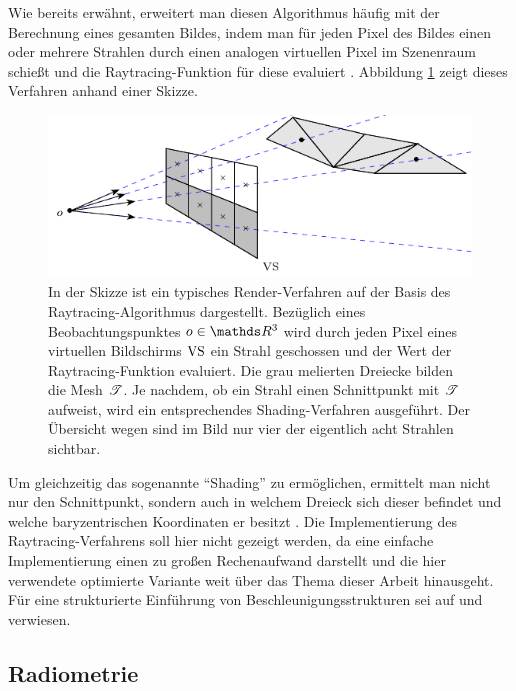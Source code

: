 		Wie bereits erwähnt, erweitert man diesen Algorithmus häufig mit der Berechnung eines gesamten Bildes, indem man für jeden Pixel des Bildes einen oder mehrere Strahlen durch einen analogen virtuellen Pixel im Szenenraum schießt und die Raytracing-Funktion für diese evaluiert \cite{pbrt3,parker-ray-tracing,nikodym-ray-tracing}.
		Abbildung \ref{fig:ray_tracing-2} zeigt dieses Verfahren anhand einer Skizze.
		\begin{figure}[h]
			\center
			\includegraphics{gg_fig/ray_tracing_2.pdf}
			\caption[Raytracing als Render-Verfahren]{In der Skizze ist ein typisches Render-Verfahren auf der Basis des Raytracing-Algorithmus dargestellt. Bezüglich eines Beobachtungspunktes $o\in\SR^3$ wird durch jeden Pixel eines virtuellen Bildschirms $\mathrm{VS}$ ein Strahl geschossen und der Wert der Raytracing-Funktion evaluiert. Die grau melierten Dreiecke bilden die Mesh $\mathscr{T}$. Je nachdem, ob ein Strahl einen Schnittpunkt mit $\mathscr{T}$ aufweist, wird ein entsprechendes Shading-Verfahren ausgeführt. Der Übersicht wegen sind im Bild nur vier der eigentlich acht Strahlen sichtbar.}
			\label{fig:ray_tracing-2}
		\end{figure}
		Um gleichzeitig das sogenannte \enquote{Shading} zu ermöglichen, ermittelt man nicht nur den Schnittpunkt, sondern auch in welchem Dreieck sich dieser befindet und welche baryzentrischen Koordinaten er besitzt \cite{pbrt3,ray-triangle-intersection}.
		Die Implementierung des Raytracing-Verfahrens soll hier nicht gezeigt werden, da eine einfache Implementierung einen zu großen Rechenaufwand darstellt und die hier verwendete optimierte Variante weit über das Thema dieser Arbeit hinausgeht.
		Für eine strukturierte Einführung von Beschleunigungsstrukturen sei auf \cite[S.~247~ff]{pbrt3} und \cite{parker-ray-tracing,nikodym-ray-tracing} verwiesen.


	\subsection{Radiometrie} %
	\label{sub:radiometrie}

